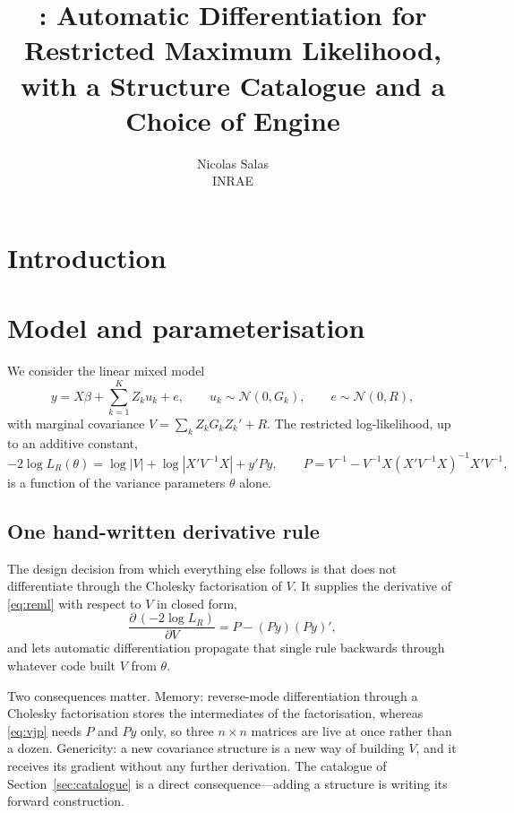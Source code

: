 \documentclass[article]{jss}
\author{Nicolas Salas\\INRAE}
\title{\pkg{remlax}: Automatic Differentiation for Restricted Maximum
       Likelihood, with a Structure Catalogue and a Choice of Engine}
\begin{document}
\maketitle

\section{Introduction}\label{sec:intro}


\section{Model and parameterisation}\label{sec:model}

We consider the linear mixed model
%
\begin{equation}\label{eq:lmm}
  y = X\beta + \sum_{k=1}^{K} Z_k u_k + e,
  \qquad u_k \sim \mathcal{N}(0, G_k), \qquad e \sim \mathcal{N}(0, R),
\end{equation}
%
with marginal covariance $V = \sum_k Z_k G_k Z_k' + R$. The restricted
log-likelihood, up to an additive constant,
%
\begin{equation}\label{eq:reml}
  -2\log L_R(\theta) = \log|V| + \log|X'V^{-1}X| + y'Py,
  \qquad
  P = V^{-1} - V^{-1}X(X'V^{-1}X)^{-1}X'V^{-1},
\end{equation}
%
is a function of the variance parameters $\theta$ alone.

\subsection{One hand-written derivative rule}

The design decision from which everything else follows is that
 does not differentiate through the Cholesky factorisation of
$V$. It supplies the derivative of \eqref{eq:reml} with respect to $V$ in
closed form,
%
\begin{equation}\label{eq:vjp}
  \frac{\partial\,(-2\log L_R)}{\partial V} = P - (Py)(Py)',
\end{equation}
%
and lets automatic differentiation propagate that single rule backwards
through whatever code built $V$ from $\theta$.

Two consequences matter. Memory: reverse-mode differentiation through a
Cholesky factorisation stores the intermediates of the factorisation, whereas
\eqref{eq:vjp} needs $P$ and $Py$ only, so three $n \times n$ matrices are
live at once rather than a dozen. Genericity: a new covariance structure is a
new way of building $V$, and it receives its gradient without any further
derivation. The catalogue of Section~\ref{sec:catalogue} is a direct
consequence---adding a structure is writing its forward construction.
\end{document}
